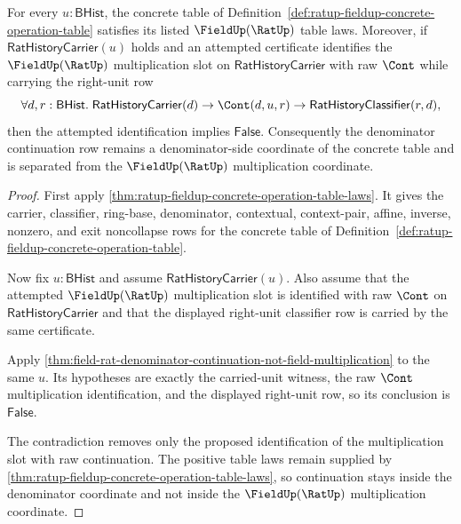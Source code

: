 \begin{theorem}
\label{thm:ratup-fieldup-operation-table-raw-continuation-separation}
For every $u:\mathsf{BHist}$, the concrete table of
Definition~\ref{def:ratup-fieldup-concrete-operation-table} satisfies its
listed $\FieldUp(\RatUp)$ table laws. Moreover, if
$\mathsf{RatHistoryCarrier}(u)$ holds and an attempted certificate identifies
the $\FieldUp(\RatUp)$ multiplication slot on
$\mathsf{RatHistoryCarrier}$ with raw $\Cont$ while carrying the right-unit row
$$
\forall d,r:\mathsf{BHist}.\;
\mathsf{RatHistoryCarrier}(d)\to
\Cont(d,u,r)\to
\mathsf{RatHistoryClassifier}(r,d),
$$
then the attempted identification implies $\mathsf{False}$. Consequently the
denominator continuation row remains a denominator-side coordinate of the
concrete table and is separated from the $\FieldUp(\RatUp)$ multiplication
coordinate.
\end{theorem}
\begin{proof}
First apply \autoref{thm:ratup-fieldup-concrete-operation-table-laws}. It gives
the carrier, classifier, ring-base, denominator, contextual, context-pair,
affine, inverse, nonzero, and exit noncollapse rows for the concrete table of
Definition~\ref{def:ratup-fieldup-concrete-operation-table}.

Now fix $u:\mathsf{BHist}$ and assume $\mathsf{RatHistoryCarrier}(u)$. Also
assume that the attempted $\FieldUp(\RatUp)$ multiplication slot is identified
with raw $\Cont$ on $\mathsf{RatHistoryCarrier}$ and that the displayed
right-unit classifier row is carried by the same certificate.

Apply
\autoref{thm:field-rat-denominator-continuation-not-field-multiplication} to the
same $u$. Its hypotheses are exactly the carried-unit witness, the raw
$\Cont$ multiplication identification, and the displayed right-unit row, so its
conclusion is $\mathsf{False}$.

The contradiction removes only the proposed identification of the multiplication
slot with raw continuation. The positive table laws remain supplied by
\autoref{thm:ratup-fieldup-concrete-operation-table-laws}, so continuation stays
inside the denominator coordinate and not inside the $\FieldUp(\RatUp)$
multiplication coordinate.
\end{proof}

